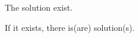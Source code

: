 \documentclass{ximera}
\begin{document}
\begin{problem}
\begin{enumerate}
The solution  exist.

    \begin{problem}
    
        If it exists, there is(are)  solution(s).

    \end{problem}


\end{enumerate}

\end{problem}
\end{document}
